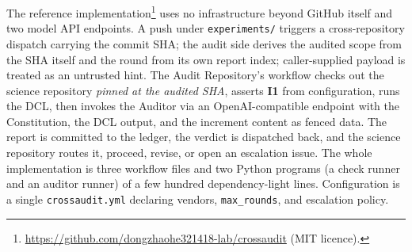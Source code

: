 \documentclass[11pt,letterpaper]{article}
\newcommand{\invariant}[1]{\textbf{I#1}}
\begin{document}
The reference implementation\footnote{\url{https://github.com/dongzhaohe321418-lab/crossaudit} (MIT licence).} uses no infrastructure beyond GitHub itself and two model API endpoints. A push under \texttt{experiments/} triggers a cross-repository dispatch carrying the commit SHA; the audit side derives the audited scope from the SHA itself and the round from its own report index; caller-supplied payload is treated as an untrusted hint. The Audit Repository's workflow checks out the science repository \emph{pinned at the audited SHA}, asserts \invariant{1} from configuration, runs the DCL, then invokes the Auditor via an OpenAI-compatible endpoint with the Constitution, the DCL output, and the increment content as fenced data. The report is committed to the ledger, the verdict is dispatched back, and the science repository routes it, proceed, revise, or open an escalation issue. The whole implementation is three workflow files and two Python programs (a check runner and an auditor runner) of a few hundred dependency-light lines. Configuration is a single \texttt{crossaudit.yml} declaring vendors, \texttt{max\_rounds}, and escalation policy.
\end{document}
